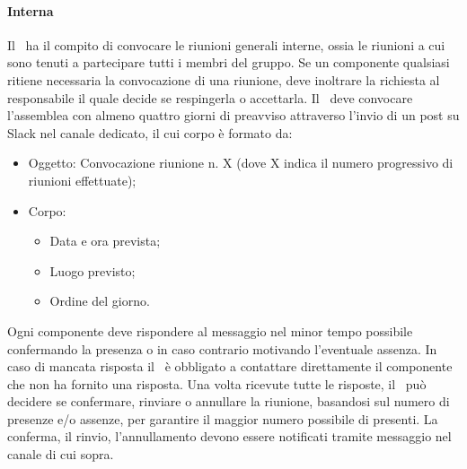 \documentclass[../NormeDiProgetto.tex]{subfiles}
\begin{document}
					\paragraph{Interna\\}
						Il \responsabilediprogetto\ ha il compito di convocare le riunioni generali
						interne, ossia le riunioni a cui sono tenuti a partecipare tutti i membri
						del gruppo. Se un componente qualsiasi ritiene necessaria la convocazione di una
						riunione, deve inoltrare la richiesta al responsabile il quale decide se respingerla
						o accettarla. Il \responsabilediprogetto\ deve convocare l'assemblea con almeno
						quattro giorni di preavviso attraverso l'invio di un post su Slack nel canale
						dedicato, il cui corpo è formato da:
						\begin{itemize}
							\item Oggetto: Convocazione riunione n. X (dove X indica il numero progressivo
							di riunioni effettuate);
							\item Corpo:
							\begin{itemize}
								\item Data e ora prevista;
								\item Luogo previsto;
								\item Ordine del giorno.
							\end{itemize}
						\end{itemize}
						Ogni componente deve rispondere al messaggio nel minor tempo possibile confermando
						la presenza o in caso contrario motivando l'eventuale assenza.
						In caso di mancata risposta il \responsabilediprogetto\ è obbligato a contattare
						direttamente il componente che non ha fornito una risposta.
						Una volta ricevute tutte le risposte, il \responsabilediprogetto\
						può decidere se confermare, rinviare o annullare la riunione, basandosi sul numero di
						presenze e/o assenze, per garantire il maggior numero possibile di presenti.
						La conferma, il rinvio, l'annullamento devono essere notificati tramite messaggio
						nel canale di cui sopra.
\end{document}
